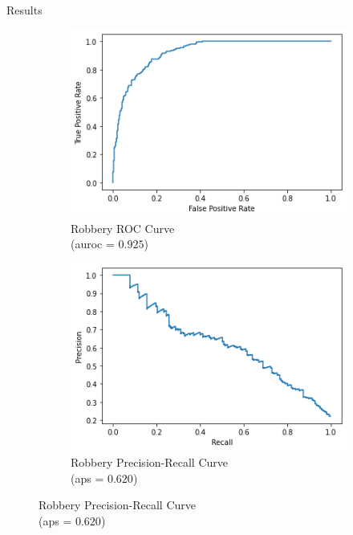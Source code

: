 \documentclass[10pt]{beamer}
\begin{document}
\begin{frame}{Results}

\begin{figure}[!htb]
{\tiny
    \centering
    \begin{subfigure}{.5\textwidth}
        \centering
        \includegraphics[width=0.7\linewidth]{ROC_robbery.png}
        \caption{Robbery ROC Curve \\
  (auroc = $0.925$)}
    \end{subfigure}%
    \begin{subfigure}{.5\textwidth}
        \centering
        \includegraphics[width=0.7\linewidth]{PRC_robbery.png}
        \caption{Robbery Precision-Recall Curve \\
  (aps = $0.620$)}
    \end{subfigure}
    
}
\end{figure}
\end{frame}
\end{document}
